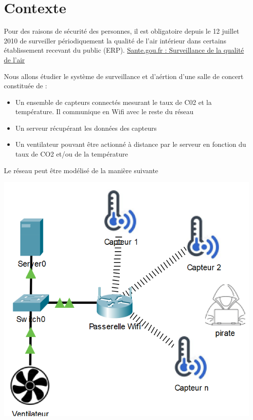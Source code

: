 \documentclass[french, 12pt]{article}%
\newcommand{\itemE}{\item[$\bullet$]}
\begin{document}
\vspace{0.25cm}


\section{Contexte}

Pour des raisons de sécurité des personnes, il est obligatoire depuis le 12 juillet 2010 de surveiller périodiquement la qualité de l'air intérieur dans certains établissement recevant du public (ERP). \href{https://www.legifrance.gouv.fr/jorf/id/JORFTEXT000046829352}{Sante.gou.fr : Surveillance de la qualité de l'air}


Nous allons étudier le système de surveillance et d'aértion d'une salle de concert constituée de : 
\begin{itemize}
\itemE Un ensemble de capteurs connectés mesurant le taux de C02 et la température. Il communique en Wifi avec le reste du réseau
\itemE Un serveur récupérant les données des capteurs
\itemE Un ventilateur pouvant être actionné à distance par le serveur en fonction du taux de CO2 et/ou de la température
\end{itemize}

Le réseau peut être modélisé de la manière suivante 


\begin{center}
\includegraphics[scale=0.5]{./ressource/topologIeWifiEntreprise.png}
\end{center}
\end{document}
